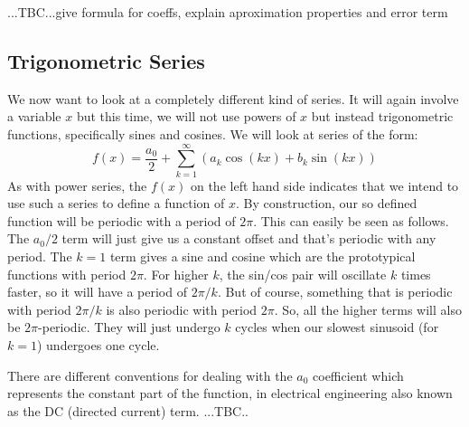 ...TBC...give formula for coeffs, explain aproximation properties and error term




\subsection{Trigonometric Series}
We now want to look at a completely different kind of series. It will again involve a variable $x$ but this time, we will not use powers of $x$ but instead trigonometric functions, specifically sines and cosines. We will look at series of the form:
\begin{equation}
\label{Eq:FourierSeries}
 f(x) = \frac{a_0}{2} + \sum_{k=1}^\infty \left(  a_k \cos(k x) + b_k \sin(k x) \right)
\end{equation}
As with power series, the $f(x)$ on the left hand side indicates that we intend to use such a series to define a function of $x$. By construction, our so defined function will be periodic with a period of $2\pi$. This can easily be seen as follows. The $a_0/2$ term will just give us a constant offset and that's periodic with any period. The $k=1$ term gives a sine and cosine which are the prototypical functions with period $2\pi$. For higher $k$, the sin/cos pair will oscillate $k$ times faster, so it will have a period of $2\pi/k$. But of course, something that is periodic with period $2\pi/k$ is also periodic with period $2\pi$. So, all the higher terms will also be $2\pi$-periodic. They will just undergo $k$ cycles when our slowest sinusoid (for $k=1$) undergoes one cycle.

\medskip
There are different conventions for dealing with the $a_0$ coefficient which represents the constant part of the function, in electrical engineering also known as the DC (directed current) term. ...TBC..


